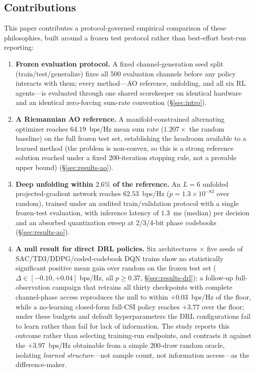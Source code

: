 \subsection{Contributions}
\label{sec:contrib}

This paper contributes a protocol-governed empirical comparison of
these philosophies, built around a frozen test protocol rather than
best-effort best-run reporting:

\begin{enumerate}
\item \textbf{Frozen evaluation protocol.} A fixed channel-generation
seed split (train/test/generalize)
fixes all 500 evaluation channels before any policy interacts with
them; every method---AO reference, unfolding, and all six RL agents---is
evaluated through one shared scorekeeper on identical hardware and an
identical zero-forcing sum-rate convention (\S\ref{sec:intro}).
\item \textbf{A Riemannian AO reference.} A manifold-constrained
alternating optimizer reaches $64.19$~bps/Hz mean sum rate
($1.207 \times$ the random baseline) on the full frozen test set,
establishing the headroom available to a learned method (the problem
is non-convex, so this is a strong reference solution reached under a
fixed 200-iteration stopping rule, not a provable upper bound)
(\S\ref{sec:results-ao}).
\item \textbf{Deep unfolding within $2.6\%$ of the reference.} An
$L{=}6$ unfolded projected-gradient network reaches $62.53$~bps/Hz
($p=1.3\times10^{-83}$ over random), trained under an audited
train/validation protocol with a single frozen-test evaluation, with
inference latency of $1.3$~ms (median) per decision and an absorbed
quantization sweep at 2/3/4-bit phase codebooks (\S\ref{sec:results-ao}).
\item \textbf{A null result for direct DRL policies.} Six
architectures $\times$ five seeds of SAC/TD3/DDPG/coded-codebook
DQN trains show no statistically significant positive mean gain over
random on the frozen
test set ($\Delta \in [-0.10,+0.04]$ bps/Hz, all $p \geq 0.37$,
\S\ref{sec:results-drl}); a follow-up full-observation campaign that
retrains all thirty checkpoints with complete channel-phase access
reproduces the null to within $+0.03$~bps/Hz of the floor, while a
no-learning closed-form full-CSI policy reaches $+3.77$ over the floor;
under these budgets and default hyperparameters the DRL configurations
fail to learn rather than fail for lack of information. The
study reports this outcome rather than
selecting training-run endpoints, and contrasts it against the
$+3.97$~bps/Hz obtainable from a simple 200-draw random oracle,
isolating \emph{learned structure}---not sample count, not information
access---as the
difference-maker.
\end{enumerate}

